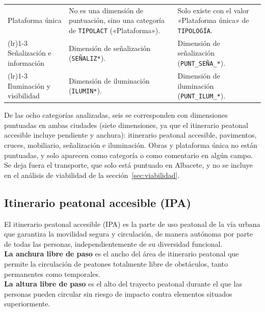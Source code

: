 \begin{longtable}{>{\raggedright\arraybackslash}p{3.4cm} >{\raggedright\arraybackslash}p{} >{\raggedright\arraybackslash}p{}}
    Plataforma única & No es una dimensión de puntuación, sino una categoría de \texttt{TIPOLACT} («Plataforma»). & Solo existe con el valor «Plataforma única» de \texttt{TIPOLOGÍA}. \\
    \arrayrulecolor{black!25}\cmidrule(lr){1-3}\arrayrulecolor{black}
    Señalización e información & Dimensión de señalización (\texttt{SEÑALIZ*}). & Dimensión de señalización (\texttt{PUNT\_SEÑA\_*}). \\
    \arrayrulecolor{black!25}\cmidrule(lr){1-3}\arrayrulecolor{black}
    Iluminación y visibilidad & Dimensión de iluminación (\texttt{ILUMIN*}). & Dimensión de iluminación (\texttt{PUNT\_ILUM\_*}). \\
\end{longtable}
\endgroup

De las ocho categorías analizadas, seis se corresponden con dimensiones puntuadas en ambas ciudades (siete dimensiones, ya que el itinerario peatonal accesible incluye pendiente y anchura): itinerario peatonal accesible, pavimentos, cruces, mobiliario, señalización e iluminación. Obras y plataforma única no están puntuadas, y solo aparecen como categoría o como comentario en algún campo. Se deja fuera el transporte, que solo está puntuado en Albacete, y no se incluye en el análisis de viabilidad de la sección~\ref{sec:viabilidad}.
\\

\subsection{Itinerario peatonal accesible (IPA)}
\label{subsec:ipa}

El itinerario peatonal accesible (IPA) es la parte de uso peatonal de la vía urbana que garantiza la movilidad segura y circulación, de manera autónoma por parte de todas las personas, independientemente de su diversidad funcional.
\\

\textbf{La anchura libre de paso} es el ancho del área de itinerario peatonal que permite la circulación de peatones totalmente libre de obstáculos, tanto permanentes como temporales.
\\

\textbf{La altura libre de paso} es el alto del trayecto peatonal durante el que las personas pueden circular sin riesgo de impacto contra elementos situados superiormente.
\\

